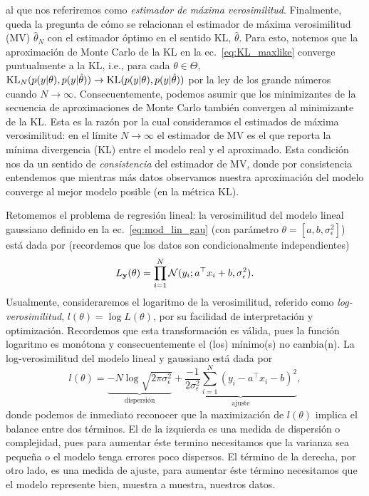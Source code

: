  al que nos  referiremos como \emph{estimador de máxima verosimilitud}. Finalmente, queda la pregunta de cómo se relacionan el estimador de máxima verosimilitud (MV) $\hat\theta_N$ con el estimador óptimo en el sentido KL, $\hat\theta$. Para esto, notemos que la aproximación de Monte Carlo de la KL en la ec.~\eqref{eq:KL_maxlike} converge puntualmente a la KL,  i.e., para cada $\theta\in\Theta$,  $\operatorname{\text{KL}}_N( p(y|\theta),p(y|\hat\theta))\to \operatorname{\text{KL}}( p(y|\theta),p(y|\hat\theta))$ por la ley de los grande números  cuando $N\to\infty$. Consecuentemente, podemos asumir que los minimizantes  de la secuencia de aproximaciones de Monte Carlo también convergen al minimizante de la KL. Esta es la razón por la cual consideramos el estimados de máxima verosimilitud: en el límite $N\to \infty$ el estimador de MV es el que reporta la mínima divergencia (KL) entre  el modelo real y el aproximado. Esta condición nos da un sentido de \emph{consistencia} del estimador de MV, donde por consistencia entendemos que mientras más datos observamos nuestra aproximación del modelo converge al mejor modelo posible (en la métrica KL). 


Retomemos el problema  de regresión lineal: la verosimilitud del modelo lineal gaussiano  definido en la ec.~\eqref{eq:mod_lin_gau} (con parámetro $\theta  = [a,b,\sigma_\epsilon^2]$) está dada por (recordemos  que  los datos son condicionalmente independientes)
\begin{equation}
	L_{\mathbf{y}}(\theta) =  \prod_{i=1}^N {\mathcal N}(y_i;a^\top x_i + b,\sigma_\epsilon^2). \label{eq:verosimilitud_lineal}
\end{equation} 
Usualmente, consideraremos el logaritmo de la verosimilitud, referido como \emph{log-verosimilitud}, $l(\theta) = \log L(\theta)$, por su facilidad de interpretación y optimización. Recordemos que esta transformación es válida, pues la función logaritmo es monótona y consecuentemente el (los) mínimo(s) no cambia(n).  La log-verosimilitud del modelo lineal y gaussiano está dada por
\begin{equation}
	l(\theta) 
		= \underbrace{-N\log \sqrt{2\pi\sigma^2_\epsilon}}_{\text{dispersión}} + \underbrace{\frac{-1}{2\sigma_\epsilon^2} \sum_{i=1}^N (y_i-a^\top x_i - b)^2}_{\text{ajuste}},
\end{equation}
donde podemos de inmediato reconocer que la maximización de $l(\theta)$ implica el balance entre dos términos. El de la izquierda es una medida de dispersión o complejidad, pues para aumentar éste termino necesitamos que la varianza sea pequeña o el modelo tenga errores poco dispersos. El término de la derecha, por otro lado, es una medida de ajuste, para aumentar éste término necesitamos que el modelo  represente bien, muestra a muestra, nuestros datos. 

